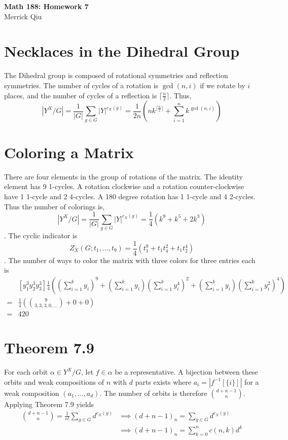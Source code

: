 \documentclass{article}
\newcommand{\inv}{^{-1}}
\begin{document}
\begin{center}
	\huge{\bf Math 188: Homework 7} \\
	Merrick Qiu 
\end{center}

\section{Necklaces in the Dihedral Group}
	The Dihedral group is composed of rotational symmetries and
	reflection symmetries. 
	The number of cycles of a rotation is 
	$\gcd(n, i)$ if we rotate by $i$ places,
	and the number of cycles of a reflection is $\lceil \frac{n}{2}\rceil$.
	Thus, 
	\[
		|Y^X/G| 
		= \frac{1}{|G|}\sum_{g\in G} |Y|^{c_X(g)} 
		= \frac{1}{2n}  
		\left(
			nk^{\lceil \frac{n}{2}\rceil} +
			\sum_{i=1}^n k^{\gcd(n, i)} 
		\right)		
	\]
	\newpage 
\section{Coloring a Matrix}
	There are four elements in the group of rotations of the matrix.
	The identity element has 9 1-cycles.
	A rotation clockwise and a rotation counter-clockwise have
	1 1-cycle and 2 4-cycles.
	A 180 degree rotation has 1 1-cycle and 4 2-cycles.
	Thus the number of colorings is,
	\[
		|Y^X/G| 
		= \frac{1}{|G|}\sum_{g\in G} |Y|^{c_X(g)}
		= \frac{1}{4} (k^9 + k^5 + 2k^3)
	\].
	The cyclic indicator is
	\[
		Z_X(G;t_1,\hdots,t_9)
		= \frac{1}{4}(t_1^9 + t_1t_4^2 + t_1t_2^4)
	\].
	The number of ways to color the matrix with three colors 
	for three entries each is 
	\begin{align*}
		&[y_1^3y_2^3y_3^3]\frac{1}{4}
		\left(\left(\sum_{i=1}^k y_i\right)^9 + 
		\left(\sum_{i=1}^k y_i\right)\left(\sum_{i=1}^k y_i^4\right)^2 + 
		\left(\sum_{i=1}^k y_i\right)\left(\sum_{i=1}^k y_i^2\right)^4\right)\\
		=& \frac{1}{4}\left( \binom{9}{3,3,3,0,\hdots} + 0 + 0\right) \\
		=& 420
	\end{align*}
	\newpage
\section{Theorem 7.9}
	For each orbit $\alpha \in Y^X / G$, 
	let $f \in \alpha$ be a representative.
	A bijection between these orbits and 
	weak compositions 
	of $n$ with $d$ parts 
	exists where $a_i = |f\inv[\{i\}]|$
	for a weak composition $(a_1,\hdots,a_d)$. 
	The number of orbits is therefore 
	$\binom{d+n-1}{n}$.
	Applying Theorem 7.9 yields 
	\begin{align*}
		\binom{d+n-1}{n} = \frac{1}{n!}\sum_{g\in G} d^{c_X(g)}
		&\implies (d+n-1)_n = \sum_{g\in G} d^{c_X(g)} \\
		&\implies (d+n-1)_n = \sum_{k=0}^n c(n, k)d^k \\
	\end{align*}
\end{document}
